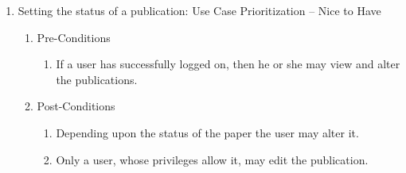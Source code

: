 \documentclass[hidelinks,a4paper,12pt]{article}
\begin{document}
\begin{enumerate}
	\item  Setting the status of a publication: Use Case Prioritization -- Nice to Have
	
	\begin{enumerate}
		\item  Pre-Conditions
		
		\begin{enumerate}
			\item  If a user has successfully logged on, then he or she may view and alter the publications.
		\end{enumerate}
		
		\item  Post-Conditions
		
		\begin{enumerate}
			\item  Depending upon the status of the paper the user may alter it.
			
			\item  Only a user, whose privileges allow it, may edit the publication. 
		\end{enumerate}
	\end{enumerate}
\end{enumerate}

\noindent  
\end{document}
